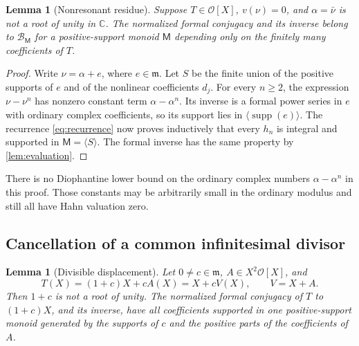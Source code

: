 \documentclass[11pt,letterpaper]{article}
\numberwithin{equation}{section}
\theoremstyle{plain}
\newtheorem{lemma}[theorem]{Lemma}
\theoremstyle{definition}
\theoremstyle{remark}
\newcommand{\C}{\mathbb C}
\newcommand{\OO}{\mathcal O}
\newcommand{\mm}{\mathfrak m}
\newcommand{\supp}{\operatorname{supp}}
\newcommand{\M}{\mathsf M}
\newcommand{\HS}{\mathscr B}
\begin{document}
\begin{lemma}[Nonresonant residue]\label{lem:nonresonant}
Suppose $T\in\OO[X]$, $v(\nu)=0$, and $\alpha=\bar\nu$ is not a root of
unity in $\C$. The normalized formal conjugacy and its inverse belong to
$\HS_\M$ for a positive-support monoid $\M$ depending only on the finitely
many coefficients of $T$.
\end{lemma}

\begin{proof}
Write $\nu=\alpha+e$, where $e\in\mm$. Let $S$ be the finite union of the
positive supports of $e$ and of the nonlinear coefficients $d_j$.
For every $n\ge2$, the expression $\nu-\nu^n$ has nonzero constant term
$\alpha-\alpha^n$. Its inverse is a formal power series in $e$ with ordinary
complex coefficients, so its support lies in $\langle\supp(e)\rangle$.
The recurrence \eqref{eq:recurrence} now proves inductively that every
$h_n$ is integral and supported in $\M=\langle S\rangle$.
The formal inverse has the same property by \cref{lem:evaluation}.
\end{proof}

There is no Diophantine lower bound on the ordinary complex numbers
$\alpha-\alpha^n$ in this proof. Those constants may be arbitrarily small
in the ordinary modulus and still all have Hahn valuation zero.

\subsection{Cancellation of a common infinitesimal divisor}

\begin{lemma}[Divisible displacement]\label{lem:displacement}
Let $0\ne c\in\mm$, $A\in X^2\OO[X]$, and
\begin{equation}\label{eq:T-displacement}
 T(X)=(1+c)X+cA(X)=X+cV(X),\qquad V=X+A.
\end{equation}
Then $1+c$ is not a root of unity. The normalized formal conjugacy of $T$
to $(1+c)X$, and its inverse, have all coefficients supported in one
positive-support monoid generated by the supports of $c$ and the positive
parts of the coefficients of $A$.
\end{lemma}
\end{document}
